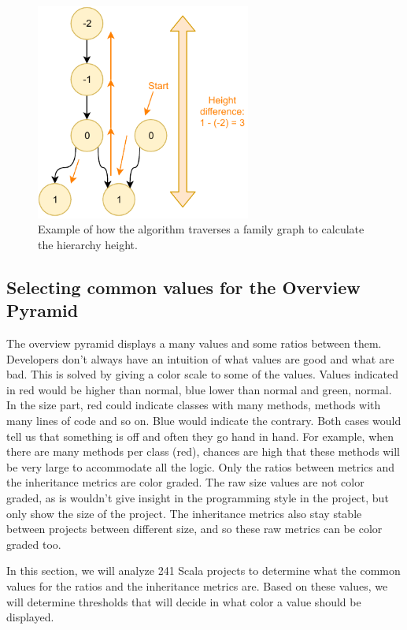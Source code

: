 \documentclass[onecolumn]{article}
\begin{document}
\begin{figure}[H]
  \centering
  \includegraphics[width=200pt]{fig/AHH-height.pdf}
  \caption{Example of how the algorithm traverses a family graph to calculate the hierarchy height.}
  \label{fig:AHH-height}
\end{figure}


\subsection{Selecting common values for the Overview Pyramid} \label{finding_common_values}
The overview pyramid displays a many values and some ratios between them. Developers don’t always have an intuition of what values are good and what are bad. This is solved by giving a color scale to some of the values. Values indicated in red would be higher than normal, blue lower than normal and green, normal. In the size part, red could indicate classes with many methods, methods with many lines of code and so on. Blue would indicate the contrary. Both cases would tell us that something is off and often they go hand in hand. For example, when there are many methods per class (red), chances are high that these methods will be very large to accommodate all the logic. Only the ratios between metrics and the inheritance metrics are color graded. The raw size values are not color graded, as is wouldn't give insight in the programming style in the project, but only show the size of the project. The inheritance metrics also stay stable between projects between different size, and so these raw metrics can be color graded too.

In this section, we will analyze 241 Scala projects to determine what the common values for the ratios and the inheritance metrics are. Based on these values, we will determine thresholds that will decide in what color a value should be displayed.
\end{document}
